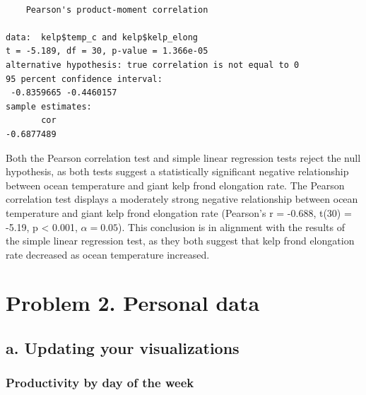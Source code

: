 \documentclass[
  letterpaper,
  DIV=11,
  numbers=noendperiod]{scrartcl}
\begin{document}
\begin{verbatim}

    Pearson's product-moment correlation

data:  kelp$temp_c and kelp$kelp_elong
t = -5.189, df = 30, p-value = 1.366e-05
alternative hypothesis: true correlation is not equal to 0
95 percent confidence interval:
 -0.8359665 -0.4460157
sample estimates:
       cor 
-0.6877489 
\end{verbatim}

Both the Pearson correlation test and simple linear regression tests
reject the null hypothesis, as both tests suggest a statistically
significant negative relationship between ocean temperature and giant
kelp frond elongation rate. The Pearson correlation test displays a
moderately strong negative relationship between ocean temperature and
giant kelp frond elongation rate (Pearson's r = -0.688, t(30) = -5.19, p
\textless{} 0.001, \(\alpha = 0.05\)). This conclusion is in alignment
with the results of the simple linear regression test, as they both
suggest that kelp frond elongation rate decreased as ocean temperature
increased.

\section{Problem 2. Personal data}\label{problem-2.-personal-data}

\subsection{a. Updating your
visualizations}\label{a.-updating-your-visualizations}

\subsubsection{Productivity by day of the
week}\label{productivity-by-day-of-the-week}
\end{document}
